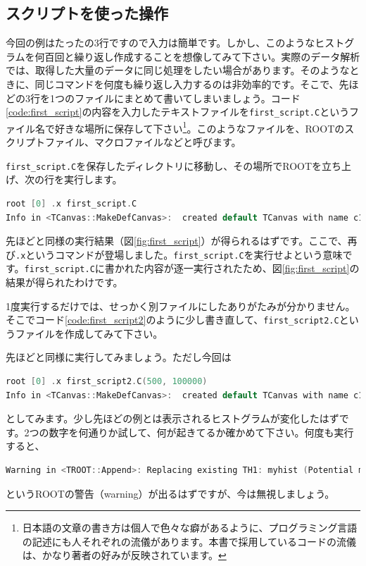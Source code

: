 {\subsection{スクリプトを使った操作}
今回の例はたったの3行ですので入力は簡単です。しかし、このようなヒストグラムを何百回と繰り返し作成することを想像してみて下さい。実際のデータ解析では、取得した大量のデータに同じ処理をしたい場合があります。そのようなときに、同じコマンドを何度も繰り返し入力するのは非効率的です。そこで、先ほどの3行を1つのファイルにまとめて書いてしまいましょう。コード\ref{code:first_script}の内容を入力したテキストファイルを\texttt{first\_script.C}というファイル名で好きな場所に保存して下さい\footnote{日本語の文章の書き方は個人で色々な癖があるように、プログラミング言語の記述にも人それぞれの流儀があります。本書で採用しているコードの流儀は、かなり著者の好みが反映されています。}。このようなファイルを、ROOTのスクリプトファイル、マクロファイルなどと呼びます。


\texttt{first\_script.C}を保存したディレクトリに移動し、その場所でROOTを立ち上げ、次の行を実行します。
\begin{lstlisting}[language=c++]
root [0] .x first_script.C
Info in <TCanvas::MakeDefCanvas>:  created default TCanvas with name c1
\end{lstlisting}
先ほどと同様の実行結果（図\ref{fig:first_script}）が得られるはずです。ここで、再び\texttt{.x}というコマンドが登場しました。\texttt{first\_script.C}を実行せよという意味です。\texttt{first\_script.C}に書かれた内容が逐一実行されたため、図\ref{fig:first_script}の結果が得られたわけです。

1度実行するだけでは、せっかく別ファイルにしたありがたみが分かりません。そこでコード\ref{code:first_script2}のように少し書き直して、\texttt{first\_script2.C}というファイルを作成してみて下さい。

先ほどと同様に実行してみましょう。ただし今回は
\begin{lstlisting}[language=c++]
root [0] .x first_script2.C(500, 100000)
Info in <TCanvas::MakeDefCanvas>:  created default TCanvas with name c1
\end{lstlisting}
としてみます。少し先ほどの例とは表示されるヒストグラムが変化したはずです。2つの数字を何通りか試して、何が起きてるか確かめて下さい。何度も実行すると、
\begin{lstlisting}[language=c++]
Warning in <TROOT::Append>: Replacing existing TH1: myhist (Potential memory leak).
\end{lstlisting}
というROOTの警告（warning）が出るはずですが、今は無視しましょう。

}
